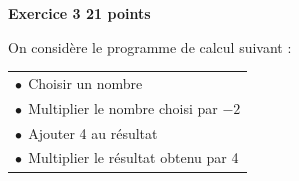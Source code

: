 \documentclass[11pt]{article}
\begin{document}
\bigskip

\textbf{Exercice 3 \hfill 21 points}

\medskip

On considère le programme de calcul suivant :

\begin{center}
\begin{tabular}{|l|}\hline
$\bullet~~$Choisir un nombre\\
$\bullet~~$Multiplier le nombre choisi par $-2$\\
$\bullet~~$Ajouter 4 au résultat\\
$\bullet~~$Multiplier le résultat obtenu par 4\\ \hline
\end{tabular}
\end{center}

\smallskip
\end{document}
